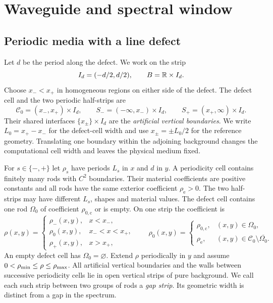 \section{Waveguide and spectral window}\label{sec:model}

\subsection{Periodic media with a line defect}\label{sec:geometry}
Let $d$ be the period along the defect. We work on the strip
\[
 I_d=(-d/2,d/2),\qquad B=\mathbb{R}\times I_d .
\]
Choose $x_-<x_+$ in homogeneous regions on either side of the defect. The
defect cell and the two periodic half-strips are
\[
 \mathcal C_0=(x_-,x_+)\times I_d,\qquad
 S_-=(-\infty,x_-)\times I_d,\qquad S_+=(x_+,\infty)\times I_d .
\]
Their shared interfaces $\{x_\pm\}\times I_d$ are the \emph{artificial
vertical boundaries}. We write $L_0=x_+-x_-$ for the defect-cell width
and use $x_\pm=\pm L_0/2$ for the reference geometry. Translating one
boundary within the adjoining background changes the computational cell
width and leaves the physical medium fixed.

For $s\in\{-,+\}$ let $\rho_s$ have periods $L_s$ in $x$ and $d$ in $y$.
A periodicity cell contains finitely many rods with $C^2$ boundaries.
Their material coefficients are positive constants and all rods have the
same exterior coefficient $\rho_{\mathrm e}>0$. The two half-strips may
have different $L_s$, shapes and material values. The defect cell contains
one rod $\Omega_0$ of coefficient $\rho_{0,\mathrm c}$ or is empty.
On one strip the coefficient is
\begin{equation}\label{eq:material}
 \rho(x,y)=
 \begin{cases}
 \rho_-(x,y),& x<x_-,\\
 \rho_0(x,y),& x_-<x<x_+,\\
 \rho_+(x,y),& x>x_+,
 \end{cases}
 \qquad
 \rho_0(x,y)=
 \begin{cases}
 \rho_{0,\mathrm c},&(x,y)\in\Omega_0,\\
 \rho_{\mathrm e},&(x,y)\in\mathcal C_0\setminus\overline{\Omega_0}.
 \end{cases}
\end{equation}
An empty defect cell has $\Omega_0=\varnothing$. Extend $\rho$ periodically
in $y$ and assume $0<\rho_{\min}\le\rho\le\rho_{\max}$. All artificial vertical
boundaries and the walls between successive periodicity cells lie in open
vertical strips of pure background. We call each such strip between two
groups of rods a \emph{gap strip}. Its geometric width is distinct from a
gap in the spectrum.


